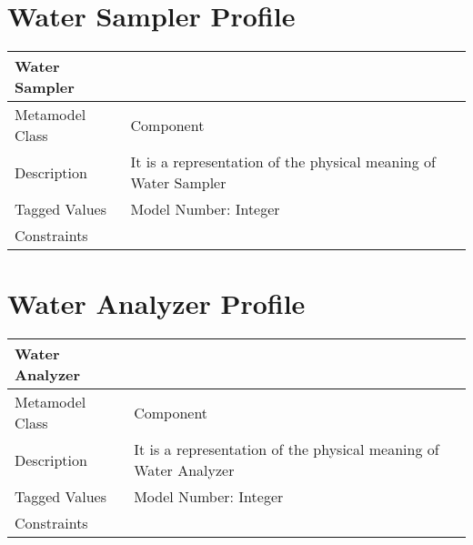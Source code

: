 \section{Water Sampler Profile}

\begin{longtable}{|p{4cm}|p{9cm}|}

\hline
\textbf{Water Sampler } & \\


\hline
Metamodel Class & Component\\

\hline
Description & It is a representation of the physical meaning of Water Sampler\\

\hline
Tagged Values & Model Number: Integer\\

\hline
Constraints &\\

\hline
\end{longtable}

\section{Water Analyzer Profile}

\begin{longtable}{|p{4cm}|p{9cm}|}

\hline
\textbf{Water Analyzer} & \\


\hline
Metamodel Class & Component\\

\hline
Description & It is a representation of the physical meaning of Water Analyzer\\

\hline
Tagged Values & Model Number: Integer\\

\hline
Constraints &\\

\hline
\end{longtable}
